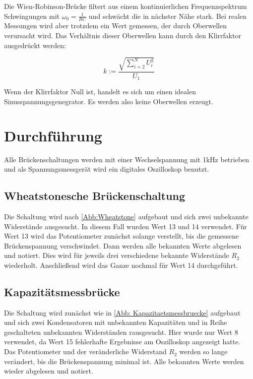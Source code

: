 \documentclass[
  bibliography=totoc,     %
  captions=tableheading,  %
  titlepage=firstiscover, %
]{scrartcl}
\begin{document}
  Die Wien-Robinson-Brücke filtert aus einem kontinuierlichen Frequenzspektrum Schwingungen mit $\omega_0 = \frac{1}{RC}$ und schwächt die in nächster Nähe stark. Bei
  realen Messungen wird aber trotzdem ein Wert gemessen, der durch Oberwellen verursacht wird. Das Verhältnis dieser Oberwellen kann durch den Klirrfaktor ausgedrückt werden:
  
  \begin{equation}
    k := \frac{\sqrt{\sum_{i=2}^N U_i^2}}{U_1} \label{eqn:Klirrfaktor}
  \end{equation} 
  
  Wenn der Klirrfaktor Null ist, handelt es sich um einen idealen Sinusspannungsgenegrator. Es werden also keine Oberwellen erzeugt.

  \newpage
  \section{Durchführung}
  \label{sec:Durchfuehrung}

  Alle Brückenschaltungen werden mit einer Wechselspannung mit 1kHz betrieben und als Spannungsmessgerät wird ein 
  digitales Oszilloskop benutzt.

  \subsection{Wheatstonesche Brückenschaltung}

  Die Schaltung wird nach \autoref{Abb:Wheatstone} aufgebaut und sich zwei unbekannte Widerstände ausgesucht. In diesem
  Fall wurden Wert 13 und 14 verwendet. Für Wert 13 wird das Potentiometer zunächst solange verstellt, bis die gemessene
  Brückenspannung verschwindet. Dann werden alle bekannten Werte abgelesen und notiert. Dies wird für jeweils drei verschiedene
  bekannte Widerstände $R_2$ wiederholt. Anschließend wird das Ganze nochmal für Wert 14 durchgeführt.

  \subsection{Kapazitätsmessbrücke}

  Die Schaltung wird zunächst wie in \autoref{Abb: Kapazitaetsmessbruecke} aufgebaut und sich zwei Kondensatoren mit unbekannten
  Kapazitäten und in Reihe geschalteten unbekannten Widerständen rausgesucht. Hier wurde nur Wert 8 verwendet, da Wert 15 fehlerhafte Ergebnisse
  am Oszilloskop angezeigt hatte. \\
  Das Potentiometer und der veränderliche Widerstand $R_2$ werden so lange verändert, bis die Brückenspannung minimal ist. Alle bekannten 
  Werte werden wieder abgelesen und notiert.
\end{document}
